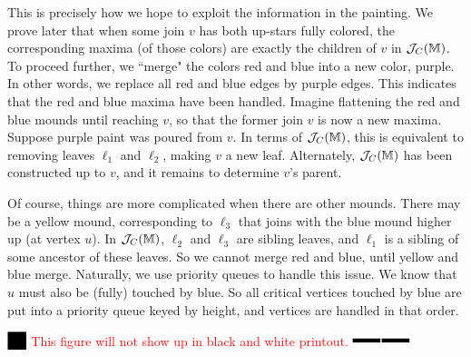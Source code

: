 \documentclass[11pt]{article}
\theoremstyle{definition}
\newcommand{\cJ}{{\cal J}}
\newcommand{\MM}{\mathbb{M}}
\newcommand{\jc}{\cJ_C}
\newcommand{\XSays}[2]{{
      {$\rule[-0.12cm]{0.2in}{0.5cm}$\fbox{\tt
            #1:} }
      \textcolor{red}{#2}
      \marginpar{\textcolor{blue}{#1}}
      {$\rule[0.1cm]{0.3in}{0.1cm}$\fbox{\tt
            end}$\rule[0.1cm]{0.3in}{0.1cm}$}
      }
   }
\newcommand{\Ben}[1]{{\XSays{Ben}{#1}}}
\begin{document}
This is precisely how we hope to exploit the information in the painting. We prove later that
when some join $v$ has both up-stars fully colored, the corresponding maxima (of those colors) are exactly
the children of $v$ in $\jc(\MM)$. To proceed further, we ``merge" the colors red and blue into a new color, purple. In other words,
we replace all red and blue edges by purple edges. This indicates that the red and blue maxima have been
handled. Imagine flattening the red and blue mounds until reaching $v$, so that the former join $v$
is now a new maxima. Suppose purple paint was poured from $v$. In terms of $\jc(\MM)$, this
is equivalent to removing leaves $\ell_1$ and $\ell_2$, making $v$ a new leaf.
Alternately, $\jc(\MM)$ has been constructed up to $v$, and it remains to determine $v$'s parent.

Of course, things are more complicated when there are other mounds. There may be a yellow mound,
corresponding to $\ell_3$ that joins with the blue mound higher up (at vertex $u$). In $\jc(\MM)$, $\ell_2$ and $\ell_3$
are sibling leaves, and $\ell_1$ is a sibling of some ancestor of these leaves. So we cannot
merge red and blue, until yellow and blue merge. Naturally, we use priority queues to handle this issue.
We know that $u$ must also be (fully) touched by blue. So all critical vertices touched by blue
are put into a priority queue keyed by height, and vertices are handled in that order.

\Ben{This figure will not show up in black and white printout.}
\end{document}
